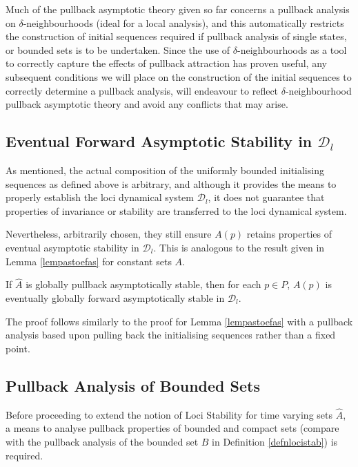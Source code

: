 Much of the pullback asymptotic theory given so far concerns a pullback
analysis on $\delta$-neighbourhoods (ideal for  a local analysis), and this
automatically restricts the construction of initial sequences required if
pullback analysis of single states, or bounded sets is to be undertaken. Since
the use of $\delta$-neighbourhoods as a tool to correctly capture the effects of
pullback attraction has proven useful, any subsequent conditions we will place
on the construction of the initial sequences to correctly determine a pullback
analysis, will endeavour to reflect $\delta$-neighbourhood pullback asymptotic
theory and avoid any conflicts that may arise.

\subsection{Eventual Forward Asymptotic Stability in $\mathcal{D}_l$}

As mentioned, the actual composition of the uniformly bounded initialising
sequences as defined above is arbitrary, and although it provides the
means to properly establish the loci dynamical system $\mathcal{D}_l$, it does
not guarantee that properties of invariance or stability are transferred to the
loci dynamical system.

Nevertheless, arbitrarily chosen, they still ensure $A(p)$ retains properties of
eventual asymptotic stability in $\mathcal{D}_l$. This is analogous to the
result given in Lemma \ref{lempastoefas} for constant sets $A$.

\begin{lemma}
\label{lempastoefashatA}
If $\hat{A}$ is globally pullback asymptotically stable, then for each $p \in
P$, $A(p)$ is eventually globally forward asymptotically stable in
$\mathcal{D}_l$.
\end{lemma}
\begin{prf}
The proof follows similarly to the proof for Lemma \ref{lempastoefas} with a
pullback analysis based upon pulling back the initialising sequences rather than
a fixed point.
\end{prf}

\subsection{Pullback Analysis of Bounded Sets}

Before proceeding to extend the notion of Loci Stability for time varying sets
$\hat{A}$, a means to analyse pullback properties of bounded and compact
sets (compare with the pullback analysis of the bounded set $B$ in
Definition \ref{defnlocistab}) is required.

